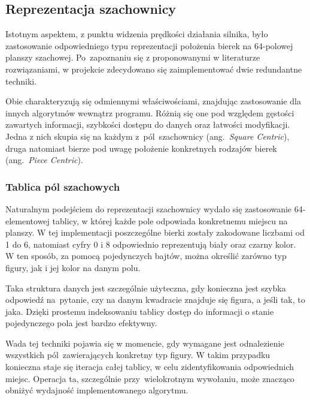 \subsection{Reprezentacja szachownicy}
\label{subsec:reprezentacja-szachownicy}

Istotnym aspektem, z punktu widzenia prędkości działania silnika, było zastosowanie odpowiedniego typu reprezentacji położenia bierek na 64-polowej planszy szachowej.
Po~zapoznaniu się z proponowanymi w literaturze rozwiązaniami, w projekcie zdecydowano się zaimplementować dwie redundantne techniki.

Obie charakteryzują się odmiennymi właściwościami, znajdując zastosowanie dla innych algorytmów wewnątrz programu.
Różnią się one pod względem gęstości zawartych informacji, szybkości dostępu do danych oraz łatwości modyfikacji.
Jedna z nich skupia się na każdym z~pól~szachownicy (ang.~\emph{Square Centric}), druga natomiast bierze pod uwagę położenie konkretnych rodzajów bierek (ang.~\emph{Piece Centric}).

\subsubsection{Tablica pól szachowych}

Naturalnym podejściem do reprezentacji szachownicy wydało się zastosowanie 64-elementowej tablicy, w której każde pole odpowiada konkretnemu miejscu na planszy.
W tej implementacji poszczególne bierki zostały zakodowane liczbami od 1 do 6, natomiast cyfry 0 i 8 odpowiednio reprezentują biały oraz czarny kolor.
W ten sposób, za pomocą pojedynczych bajtów, można określić zarówno typ figury, jak i jej kolor na danym polu.

Taka struktura danych jest szczególnie użyteczna, gdy konieczna jest szybka odpowiedź na~pytanie, czy na danym kwadracie znajduje się figura, a jeśli tak, to jaka.
Dzięki prostemu indeksowaniu tablicy dostęp do informacji o stanie pojedynczego pola jest bardzo efektywny.

Wada tej techniki pojawia się w momencie, gdy wymagane jest odnalezienie wszystkich pól~zawierających konkretny typ figury.
W takim przypadku konieczna staje się iteracja całej tablicy, w celu zidentyfikowania odpowiednich miejsc.
Operacja ta, szczególnie przy~wielokrotnym wywołaniu, może znacząco obniżyć wydajność implementowanego algorytmu.

%
%
%
%


